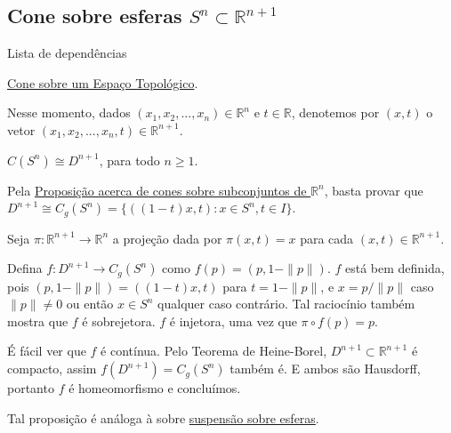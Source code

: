 \subsection{Cone sobre esferas $S^n\subset\mathbb{R}^{n+1}$}
\label{cone-esfera-prop}
\begin{titlemize}{Lista de dependências}
	\item \hyperref[cone-def]{Cone sobre um Espaço Topológico}.
\end{titlemize}

Nesse momento, dados $(x_1,x_2,...,x_n) \in \mathbb{R}^n$ e $t \in \mathbb{R}$, denotemos por $(x,t)$ o vetor $(x_1,x_2,...,x_n,t) \in \mathbb{R}^{n+1}$.

\begin{prop}
	$C(S^n) \cong D^{n+1}$, para todo $n\geq 1$.
 
    \begin{dem}
        Pela \hyperref[cone-euclidiano-prop]{Proposição acerca de cones sobre subconjuntos de $\mathbb{R}^n$}, basta provar que $D^{n+1}\cong C_g(S^n) = \{((1-t)x,t):x\in S^n, t\in I\}$.

        Seja $\pi:\mathbb{R}^{n+1}\to\mathbb{R}^n$ a projeção dada por $\pi(x,t) = x$ para cada $(x,t) \in \mathbb{R}^{n+1}$.
        
        Defina $f:D^{n+1}\to C_g(S^n)$ como $f(p) = (p,1-\|p\|)$. $f$ está bem definida, pois $(p,1-\|p\|)=((1-t)x,t)$ para $t=1-\|p\|$, e $x=p/\|p\|$ caso $\|p\|\neq 0$ ou então $x\in S^n$ qualquer caso contrário. Tal raciocínio também mostra que $f$ é sobrejetora. $f$ é injetora, uma vez que $\pi \circ f(p) = p$.

        É fácil ver que $f$ é contínua.  Pelo Teorema de Heine-Borel, $D^{n+1} \subset \mathbb{R}^{n+1}$ é compacto, assim $f(D^{n+1})=C_g(S^n)$ também é. E ambos são Hausdorff, portanto $f$ é homeomorfismo e concluímos. 
    \end{dem}
\end{prop}

Tal proposição é análoga à sobre \hyperref[suspensao-esfera-prop]{suspensão sobre esferas}.

